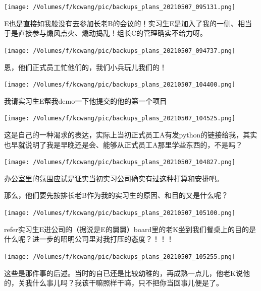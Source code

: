 \documentclass[9pt, b5paper]{article}
\begin{document}
\begin{center}
\texttt{[image: /Volumes/f/kcwang/pic/backups\_plans\_20210507\_095131.png]}
\end{center}

E也是直接如我般没有去参加长老B的会议的！实习生E是加入了我的一侧、相当于是直接参与煽风点火、煽动捣乱！组长C的管理确实不给力呀。 

\begin{center}
\texttt{[image: /Volumes/f/kcwang/pic/backups\_plans\_20210507\_094737.png]}
\end{center}

恩，他们正式员工忙他们的，我们小兵玩儿我们的！

\begin{center}
\texttt{[image: /Volumes/f/kcwang/pic/backups\_plans\_20210507\_104400.png]}
\end{center}

我请实习生E帮我demo一下他提交的他的第一个项目

\begin{center}
\texttt{[image: /Volumes/f/kcwang/pic/backups\_plans\_20210507\_104525.png]}
\end{center}

这是自己的一种渴求的表达，实际上当初正式员工A有发python的链接给我，其实也早就说明了我是早晚还是会、能够从正式员工A那里学些东西的，不是吗？

\begin{center}
\texttt{[image: /Volumes/f/kcwang/pic/backups\_plans\_20210507\_104827.png]}
\end{center}

办公室里的氛围应试是证实当初实习公司确实有过这种打算和安排吧。 

那么，他们要先按排长老B作为我的实习生的原因、和目的又是什么呢？

\begin{center}
\texttt{[image: /Volumes/f/kcwang/pic/backups\_plans\_20210507\_105100.png]}
\end{center}

refer实习生E进公司的（据说是E的舅舅）board里的老K坐到我们餐桌上的目的是什么呢？进一步的昭明公司里对我打压的态度？！！！

\begin{center}
\texttt{[image: /Volumes/f/kcwang/pic/backups\_plans\_20210507\_105255.png]}
\end{center}

这些是那件事的后述。当时的自已还是比较幼稚的，再成熟一点儿，他老K说他的，关我什么事儿吗？我该干嘛照样干嘛，只不把你当回事儿便是了。 
\end{document}

